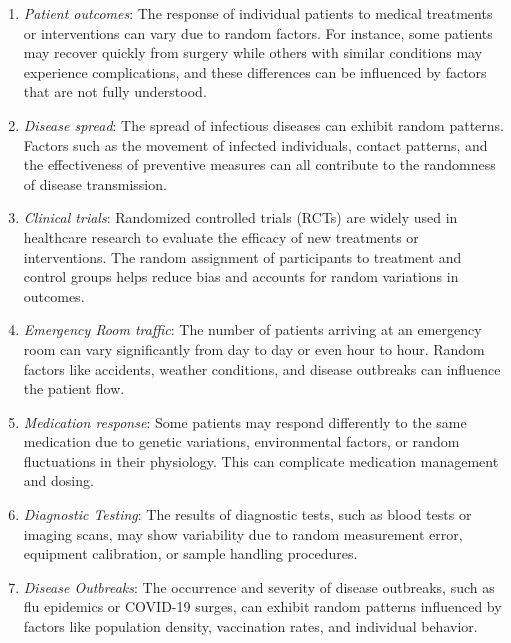 \documentclass{tufte-handout}
\begin{document}
\begin{enumerate}
\item \textit{Patient outcomes}: The response of individual patients to medical treatments or interventions can vary due to random factors. For instance, some patients may recover quickly from surgery while others with similar conditions may experience complications, and these differences can be influenced by factors that are not fully understood.

\item \textit{Disease spread}: The spread of infectious diseases can exhibit random patterns. Factors such as the movement of infected individuals, contact patterns, and the effectiveness of preventive measures can all contribute to the randomness of disease transmission.

\item \textit{Clinical trials}: Randomized controlled trials (RCTs) are widely used in healthcare research to evaluate the efficacy of new treatments or interventions. The random assignment of participants to treatment and control groups helps reduce bias and accounts for random variations in outcomes.

\item \textit{Emergency Room traffic}: The number of patients arriving at an emergency room can vary significantly from day to day or even hour to hour. Random factors like accidents, weather conditions, and disease outbreaks can influence the patient flow.

\item \textit{Medication response}: Some patients may respond differently to the same medication due to genetic variations, environmental factors, or random fluctuations in their physiology. This can complicate medication management and dosing.

\item \textit{Diagnostic Testing}: The results of diagnostic tests, such as blood tests or imaging scans, may show variability due to random measurement error, equipment calibration, or sample handling procedures.

\item \textit{Disease Outbreaks}: The occurrence and severity of disease outbreaks, such as flu epidemics or COVID-19 surges, can exhibit random patterns influenced by factors like population density, vaccination rates, and individual behavior.


\end{enumerate}
\end{document}

